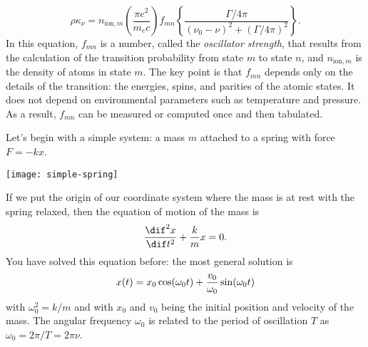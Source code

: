 \begin{equation}
    \rho\kappa_\nu = n_{\mathrm{ion},m} \left(\frac{\pi e^2}{m_e c}\right) f_{mn}
        \left\{\frac{\Gamma/4\pi}{(\nu_0-\nu)^2 + (\Gamma/4\pi)^2}\right\}.
\end{equation}
In this equation, $f_{mn}$ is a number, called the \emph{oscillator strength}, that results from the calculation of the transition probability from state $m$ to state $n$, and $n_{\mathrm{ion},m}$ is the density of atoms in state $m$.  The key point is that $f_{mn}$ depends only on the details of the transition: the energies, spins, and parities of the atomic states.  It does not depend on environmental parameters such as temperature and pressure.  As a result, $f_{mn}$ can be measured or computed once and then tabulated.

\begin{sidebar}
\label{sb.damped-driven-oscillator}
Let's begin with a simple system: a mass $m$ attached to a spring with force $F = -kx$.

\begin{center}
\texttt{[image: simple-spring]}
\end{center}

\noindent If we put the origin of our coordinate system where the mass is at rest with the spring relaxed, then the equation of motion of the mass is
\begin{equation}\label{e.SHO-basic}
	\DDtt{x} + \frac{k}{m} x = 0.
\end{equation}
You have solved this equation before: the most general solution is
\begin{equation}\label{e.SHO-general-solution}
	x(t) = x_{0}\cos(\omega_{0} t) + \frac{v_{0}}{\omega_{0}}\sin(\omega_{0} t)
\end{equation}
with $\omega_{0}^{2} = k/m$ and with $x_{0}$ and $v_{0}$ being the initial position and velocity of the mass. The angular frequency $\omega_{0}$ is related to the period of oscillation $T$ as $\omega_{0} = 2\pi/T = 2\pi\nu$.


\end{sidebar}
